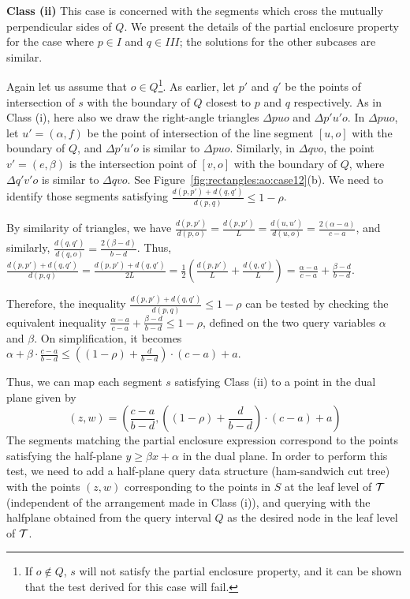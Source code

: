 {\bf Class (ii)} This case is concerned with the segments which cross 
the mutually perpendicular sides of $Q$. We present the details 
of the partial enclosure property for the case where $p \in I$ 
and $q \in III$; the solutions for the other subcases  
are similar. 

Again let us assume that $o \in Q$\footnote{If $o \not\in Q$, $s$ 
will not satisfy the partial enclosure property, and it can be shown 
that the test derived for this case will fail.}. 
As earlier, let $p'$ 
and $q'$ be the points of intersection of $s$ with the boundary of 
$Q$ closest to $p$ and $q$ respectively. As in Class (i), here also 
we draw the 
right-angle triangles $\Delta p u o$ and  $\Delta p'u'o$. In 
$\Delta p u o$, let $u' = (\alpha, f)$ be the point of intersection 
of the line segment $[u, o]$ with the boundary of $Q$, and 
$\Delta p'u'o$ is similar to $\Delta p u o$. Similarly, in 
$\Delta q v o$, the point $v' = (e, \beta)$ 
is the intersection point of $[v, o]$ with the boundary of $Q$, 
where $\Delta q' v' o$ is similar to $\Delta q v o$. See 
Figure~\ref{fig:rectangles:ao:case12}(b). We need to identify those 
segments satisfying $\frac{d(p, p')+d(q, q')}{d(p, q)} \leq 1-\rho$. 

By similarity of triangles, we have  $\frac{d(p, p')}{d(p, o)} = 
\frac{d(p, p')}{L} = \frac{d(u, u')}{d(u, o)} = \frac{2(\alpha - a)}
{c - a}$, and similarly, $\frac{d(q, q')}{d(q, o)} = \frac{2(\beta - d)}{b - 
d}$. 
Thus,
$\frac{d(p, p') + d(q, q')}{d(p, q)}=\frac{d(p, p') + d(q, q')}{2L} 
=\frac{1}{2} \left (\frac{d(p, p')}{L} + \frac{d(q, q')}{L} \right) 
= \frac{\alpha - a}{c - a} + \frac{\beta - d}{b - d}$.

Therefore, the inequality $\frac{d(p, p') + d(q, q')}{d(p, q)} 
\leq 1 - \rho$ can be tested by checking the equivalent inequality 
$\frac{\alpha - a}{c - a} + \frac{\beta - d}{b - d} \leq 1 - \rho$, 
defined on the two query variables $\alpha$ and $\beta$. On 
simplification, it becomes $\alpha + \beta \cdot \frac{c-a}{b-d} \leq 
\left ( (1 - \rho) + \frac{d}{b-d} \right ) \cdot (c-a) + a$.

Thus, we can map each segment $s$ satisfying Class (ii) to a point in the dual 
plane
given by
\[ (z,w)=
\left(\frac{c-a}{b-d}, \left ( (1 - \rho) + \frac{d}{b-d} \right ) \cdot (c-a) + 
a \right )
\]
The segments matching the 
partial enclosure expression correspond to the points satisfying the 
half-plane $y \geq \beta x + \alpha$ in the dual plane. In order 
to perform this test, we need to add a half-plane query data structure
(ham-sandwich cut tree) \cite{chan2012} with the points $(z,w)$ 
corresponding to the 
points in $S$ at the leaf level of $\cal T$ (independent of the arrangement 
made in Class (i)), and querying with the halfplane obtained from the query 
interval $Q$ as the desired node in the leaf level of $\cal T$. 

